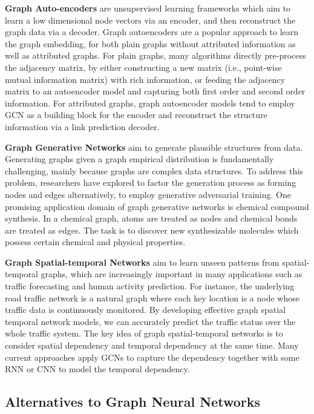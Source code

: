 \textbf{Graph Auto-encoders} are unsupervised learning frameworks which aim to learn a low dimensional node vectors via an encoder, and then reconstruct the graph data via a decoder. Graph autoencoders are a popular approach to learn the graph embedding, for both plain graphs without attributed information as well as attributed graphs. For plain graphs, many algorithms directly pre-process the adjacency matrix, by either constructing a new matrix (i.e., point-wise mutual information matrix) with rich information, or feeding the adjacency matrix to an autoencoder model and capturing both first order and second order information. For attributed graphs, graph autoencoder models tend to employ GCN as a building
block for the encoder and reconstruct the structure information via a link prediction decoder.

\textbf{Graph Generative Networks} aim to generate plausible structures from data. Generating graphs given a graph empirical distribution is fundamentally challenging, mainly because graphs are complex data structures. To address this problem, researchers have explored to factor the generation process as forming nodes and edges alternatively, to employ generative adversarial training. One promising application domain of graph generative networks is chemical compound synthesis. In a chemical graph, atoms are treated as nodes and chemical bonds are treated as edges. The task is to discover new synthesizable molecules which possess certain chemical and physical properties. 

\textbf{Graph Spatial-temporal Networks} aim to learn unseen patterns from spatial-temporal graphs, which are increasingly important in many applications such as traffic forecasting and human activity prediction. For instance, the underlying road traffic network is a natural graph where each key location is a node whose traffic data is continuously monitored. By developing effective graph spatial temporal network models, we can accurately predict the traffic status over the whole traffic system. The key idea of graph spatial-temporal networks is to consider spatial dependency and temporal dependency at the same time. Many current approaches apply GCNs to capture the dependency together with some RNN or CNN to model the temporal dependency.


\subsection{Alternatives to Graph Neural Networks}


